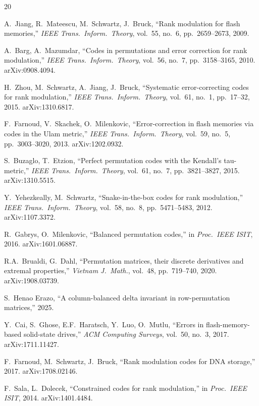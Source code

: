 \documentclass[11pt]{article}
\begin{document}
\begin{thebibliography}{20}

A.~Jiang, R.~Mateescu, M.~Schwartz, J.~Bruck, ``Rank modulation for flash memories,'' \emph{IEEE Trans.\ Inform.\ Theory}, vol.~55, no.~6, pp.~2659--2673, 2009.

A.~Barg, A.~Mazumdar, ``Codes in permutations and error correction for rank modulation,'' \emph{IEEE Trans.\ Inform.\ Theory}, vol.~56, no.~7, pp.~3158--3165, 2010. arXiv:0908.4094.

H.~Zhou, M.~Schwartz, A.~Jiang, J.~Bruck, ``Systematic error-correcting codes for rank modulation,'' \emph{IEEE Trans.\ Inform.\ Theory}, vol.~61, no.~1, pp.~17--32, 2015. arXiv:1310.6817.

F.~Farnoud, V.~Skachek, O.~Milenkovic, ``Error-correction in flash memories via codes in the Ulam metric,'' \emph{IEEE Trans.\ Inform.\ Theory}, vol.~59, no.~5, pp.~3003--3020, 2013. arXiv:1202.0932.

S.~Buzaglo, T.~Etzion, ``Perfect permutation codes with the Kendall's tau-metric,'' \emph{IEEE Trans.\ Inform.\ Theory}, vol.~61, no.~7, pp.~3821--3827, 2015. arXiv:1310.5515.

Y.~Yehezkeally, M.~Schwartz, ``Snake-in-the-box codes for rank modulation,'' \emph{IEEE Trans.\ Inform.\ Theory}, vol.~58, no.~8, pp.~5471--5483, 2012. arXiv:1107.3372.

R.~Gabrys, O.~Milenkovic, ``Balanced permutation codes,'' in \emph{Proc.\ IEEE ISIT}, 2016. arXiv:1601.06887.

R.A.~Brualdi, G.~Dahl, ``Permutation matrices, their discrete derivatives and extremal properties,'' \emph{Vietnam J.\ Math.}, vol.~48, pp.~719--740, 2020. arXiv:1908.03739.

S.~Henao Erazo, ``A column-balanced delta invariant in row-permutation matrices,'' 2025.

Y.~Cai, S.~Ghose, E.F.~Haratsch, Y.~Luo, O.~Mutlu, ``Errors in flash-memory-based solid-state drives,'' \emph{ACM Computing Surveys}, vol.~50, no.~3, 2017. arXiv:1711.11427.

F.~Farnoud, M.~Schwartz, J.~Bruck, ``Rank modulation codes for DNA storage,'' 2017. arXiv:1708.02146.

F.~Sala, L.~Dolecek, ``Constrained codes for rank modulation,'' in \emph{Proc.\ IEEE ISIT}, 2014. arXiv:1401.4484.

\end{thebibliography}
\end{document}
